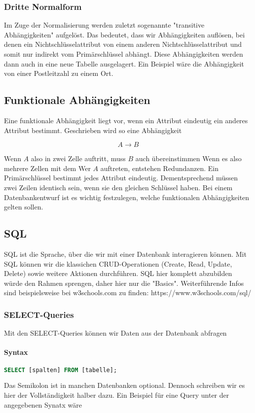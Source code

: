 \documentclass{article}
\begin{document}
	\subsubsection{Dritte Normalform}
	Im Zuge der Normalisierung werden zuletzt sogenannte "transitive Abhängigkeiten" aufgelöst. Das bedeutet, dass wir Abhängigkeiten auflösen, bei denen ein Nichtschlüsselattribut von einem anderen Nichtschlüsselattribut und somit nur indirekt vom Primärschlüssel abhängt. Diese Abhängigkeiten werden dann auch in eine neue Tabelle ausgelagert. Ein Beispiel wäre die Abhängigkeit von einer Postleitzahl zu einem Ort.

	\subsection{Funktionale Abhängigkeiten}
	Eine funktionale Abhängigkeit liegt vor, wenn ein Attribut eindeutig ein anderes Attribut bestimmt. Geschrieben wird so eine Abhängigkeit

	\begin{equation*}
		A \rightarrow B
	\end{equation*}

	Wenn $A$ also in zwei Zelle auftritt, muss $B$ auch übereinstimmen
	Wenn es also mehrere Zellen mit dem Wer $A$ auftreten, entstehen Redundanzen. Ein Primärschlüssel bestimmt jedes Attribut eindeutig. Dementsprechend müssen zwei Zeilen identisch sein, wenn sie den gleichen Schlüssel haben. Bei einem Datenbankentwurf ist es wichtig festzulegen, welche funktionalen Abhängigkeiten gelten sollen.

	\subsection{SQL}
	SQL ist die Sprache, über die wir mit einer Datenbank interagieren können. Mit SQL können wir die klassichen CRUD-Operationen (Create, Read, Update, Delete) sowie weitere Aktionen durchführen. SQL hier komplett abzubilden würde den Rahmen sprengen, daher hier nur die "Basics". Weiterführende Infos sind beispielsweise bei w3schools.com zu finden: https://www.w3schools.com/sql/

	\subsubsection{SELECT-Queries}
	Mit den SELECT-Queries können wir Daten aus der Datenbank abfragen
	
	\paragraph{Syntax}
	\begin{lstlisting}[language=SQL]
	SELECT [spalten] FROM [tabelle]; 
	\end{lstlisting}
	Das Semikolon ist in manchen Datenbanken optional. Dennoch schreiben wir es hier der Vollständigkeit halber dazu. Ein Beispiel für eine Query unter der angegebenen Synatx wäre
\end{document}
